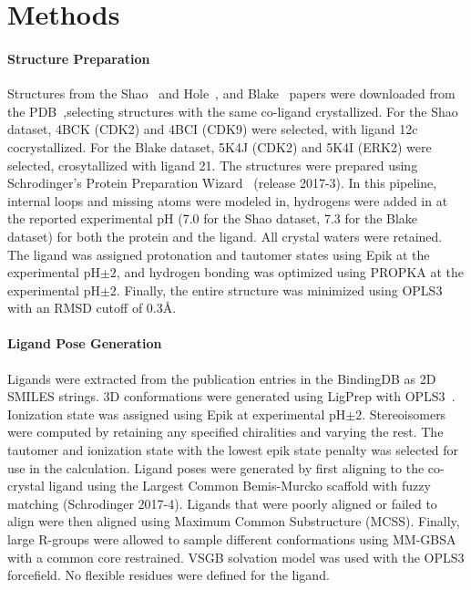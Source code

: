 \documentclass[9pt,lineno]{elife-modified} %
\begin{document}
%
%
%
%
\section{Methods}

\paragraph{Structure Preparation}
Structures from the Shao~\citep{Shao2013-oe} and Hole~\citep{Hole2013-sr}, and Blake~\citep{Blake2016-su} papers were downloaded from the PDB~\citep{Berman2002-hg},selecting structures with the same co-ligand crystallized. For the Shao dataset, 4BCK (CDK2) and 4BCI (CDK9) were selected, with ligand 12c cocrystallized. For the Blake dataset, 5K4J (CDK2) and 5K4I (ERK2) were selected, crosytallized with ligand 21. The structures were prepared using Schrodinger’s Protein Preparation Wizard~\citep{Sastry2013-ax} (release 2017-3). In this pipeline, internal loops and missing atoms were modeled in, hydrogens were added in at the reported experimental pH (7.0 for the Shao dataset, 7.3 for the Blake dataset) for both the protein and the ligand. All crystal waters were retained. The ligand was assigned protonation and tautomer states using Epik at the experimental pH$\pm2$, and hydrogen bonding was optimized using PROPKA at the experimental pH$\pm2$. Finally, the entire structure was minimized using OPLS3 with an RMSD cutoff of 0.3\AA.

\paragraph{Ligand Pose Generation}
Ligands were extracted from the publication entries in the BindingDB as  2D SMILES strings. 3D conformations were generated using LigPrep with OPLS3~\citep{Harder2016-zn}. Ionization state was assigned using Epik at experimental pH$\pm2$. Stereoisomers were computed by retaining any specified chiralities and varying the rest. The tautomer and ionization state with the lowest epik state penalty was selected for use in the calculation. Ligand poses were generated by first aligning to the co-crystal ligand using the Largest Common Bemis-Murcko scaffold with fuzzy matching (Schrodinger 2017-4). Ligands that were poorly aligned or failed to align were then aligned using Maximum Common Substructure (MCSS). Finally, large R-groups were allowed to sample different conformations using MM-GBSA with a common core restrained. VSGB solvation model was used with the OPLS3 forcefield. No flexible residues were defined for the ligand. 
\end{document}
